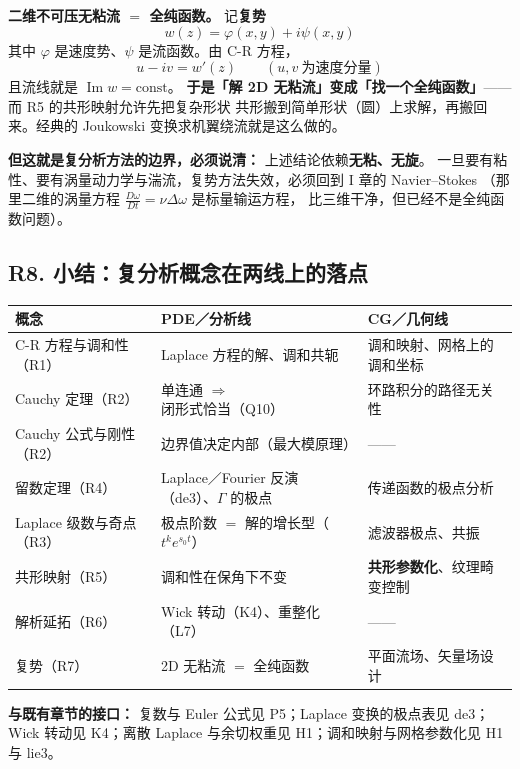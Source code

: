 \textbf{二维不可压无粘流 $=$ 全纯函数。} 记\textbf{复势}
\[
w(z)=\varphi(x,y)+i\psi(x,y)
\]
其中 $\varphi$ 是速度势、$\psi$ 是流函数。由 C-R 方程，
\[
u-iv=w'(z)\qquad(u,v\ \text{为速度分量})
\]
且流线就是 $\operatorname{Im}w=\text{const}$。
\textbf{于是「解 2D 无粘流」变成「找一个全纯函数」}——而 R5 的共形映射允许先把复杂形状
共形搬到简单形状（圆）上求解，再搬回来。经典的 Joukowski 变换求机翼绕流就是这么做的。

\textbf{但这就是复分析方法的边界，必须说清：} 上述结论依赖\textbf{无粘、无旋}。
一旦要有粘性、要有涡量动力学与湍流，复势方法失效，必须回到 I 章的 Navier--Stokes
（那里二维的涡量方程 $\frac{D\omega}{Dt}=\nu\Delta\omega$ 是标量输运方程，
比三维干净，但已经不是全纯函数问题）。

\subsection{R8. 小结：复分析概念在两线上的落点}

\begin{center}
\begin{tabular}{L{3.4cm}L{5.4cm}L{5.6cm}}
\toprule
\textbf{概念} & \textbf{PDE／分析线} & \textbf{CG／几何线} \\
\midrule
C-R 方程与调和性（R1） & Laplace 方程的解、调和共轭 & 调和映射、网格上的调和坐标 \\
Cauchy 定理（R2） & 单连通 $\Rightarrow$ 闭形式恰当（Q10） & 环路积分的路径无关性 \\
Cauchy 公式与刚性（R2） & 边界值决定内部（最大模原理） & —— \\
留数定理（R4） & Laplace／Fourier 反演（de3）、$\Gamma$ 的极点 & 传递函数的极点分析 \\
Laplace 级数与奇点（R3） & 极点阶数 $=$ 解的增长型（$t^ke^{s_0t}$） & 滤波器极点、共振 \\
共形映射（R5） & 调和性在保角下不变 & \textbf{共形参数化}、纹理畸变控制 \\
解析延拓（R6） & Wick 转动（K4）、重整化（L7） & —— \\
复势（R7） & 2D 无粘流 $=$ 全纯函数 & 平面流场、矢量场设计 \\
\bottomrule
\end{tabular}
\end{center}

\textbf{与既有章节的接口：} 复数与 Euler 公式见 P5；Laplace 变换的极点表见 de3；
Wick 转动见 K4；离散 Laplace 与余切权重见 H1；调和映射与网格参数化见 H1 与 lie3。
